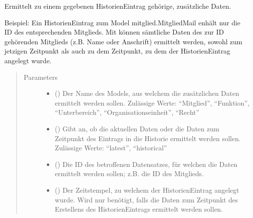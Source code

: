 \documentclass[letterpaper,10pt,english]{sphinxmanual}
\begin{document}
\begin{fulllineitems}
\label{\detokenize{masterCodeDoc:historie.templatetags.t_historie.get_associated_data.get_associated_data}}
Ermittelt zu einem gegebenen Historien\sphinxhyphen{}Eintrag gehörige, zusätzliche Daten.

Beispiel: Ein Historien\sphinxhyphen{}Eintrag zum Model mitglied.MitgliedMail enhält nur die ID des entsprechenden Mitglieds.
Mit  können sämtliche Daten des zur ID gehörenden Mitglieds (z.B. Name oder Anschrift) ermittelt werden,
sowohl zum jetzigen Zeitpunkt als auch zu dem Zeitpunkt, zu dem der Historien\sphinxhyphen{}Eintrag angelegt wurde.
\begin{quote}\begin{description}
\item[{Parameters}] \leavevmode\begin{itemize}
\item {} 
 () \textendash{} Der Name des Models, aus welchem die zusätzlichen Daten ermittelt werden sollen.
Zulässige Werte: “Mitglied”, “Funktion”, “Unterbereich”, “Organisationseinheit”, “Recht”

\item {} 
 () \textendash{} Gibt an, ob die aktuellen Daten oder die Daten zum Zeitpunkt des Eintrags in die Historie ermittelt werden sollen.
Zulässige Werte: “latest”, “historical”

\item {} 
 () \textendash{} Die ID des betroffenen Datensatzes, für welchen die Daten ermittelt werden sollen; z.B. die ID des Mitglieds.

\item {} 
 (\sphinxstyleliteralemphasis{\sphinxupquote{, }}) \textendash{} Der Zeitstempel, zu welchem der Historien\sphinxhyphen{}Eintrag angelegt wurde. Wird nur benötigt, falls die Daten zum Zeitpunkt
des Erstellens des Historien\sphinxhyphen{}Eintrags ermittelt werden sollen.


\end{itemize}
\end{description}
\end{quote}
\end{fulllineitems}
\end{document}
